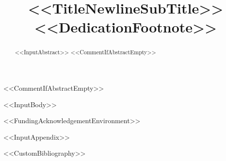 \documentclass[%
journal = <<TemplateBaseName>>,
manuscript = article,
layout = twocolumn,
<<DocumentClassOptions>>]{achemso}
\title[<<ShortTitle>>]{<<TitleNewlineSubTitle>><<DedicationFootnote>>}
\begin{document}
<<CommentIfAbstractEmpty>>\begin{abstract}
<<InputAbstract>>
<<CommentIfAbstractEmpty>>\end{abstract}

<<InputBody>>

<<FundingAcknowledgementEnvironment>>

\appendix
<<InputAppendix>>

<<CustomBibliography>>
\end{document}
